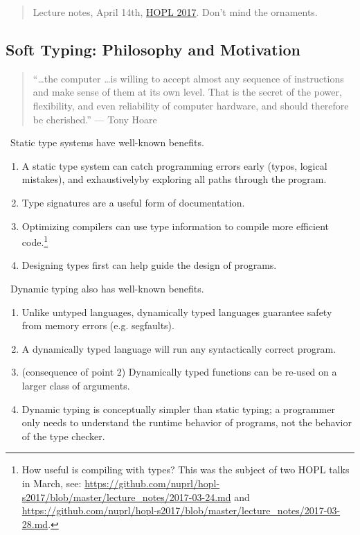 \documentclass{article}
\begin{document}

\newcommand{\todo}[1]{\textbf{TODO: #1}}

\begin{abstract}
Lecture notes, April 14th, \href{http://www.ccs.neu.edu/home/matthias/7480-s17/index.html}{HOPL 2017}.
Don't mind the ornaments.
\end{abstract}

\subsection*{Soft Typing: Philosophy and Motivation}

\begin{quote}
``\ldots the computer \ldots is willing to accept almost any sequence of
  instructions and make sense of them at its own level.
  That is the secret of the power, flexibility, and even reliability of computer
  hardware, and should therefore be cherished.'' --- Tony Hoare~\cite{h-dtic-1973}
\end{quote}

\noindent \aldine~Static type systems have well-known benefits.
\begin{enumerate}
\item
  A static type system can catch programming errors early (typos, logical mistakes),
  and exhaustively\textemdash by exploring all paths through the program.
\item
  Type signatures are a useful form of documentation.
\item
  Optimizing compilers can use type information to compile more efficient
  code.\footnote{How useful is compiling with types? This was the subject of two HOPL talks in March, see:
                 \url{https://github.com/nuprl/hopl-s2017/blob/master/lecture_notes/2017-03-24.md} and
                 \url{https://github.com/nuprl/hopl-s2017/blob/master/lecture_notes/2017-03-28.md}.}
\item
  Designing types first can help guide the design of programs.
\end{enumerate}

\noindent \bomb~Dynamic typing also has well-known benefits.
\begin{enumerate}
\item
  Unlike untyped languages, dynamically typed languages guarantee safety from
  memory errors (e.g. segfaults).
\item
  A dynamically typed language will run any syntactically correct program.
\item
  (consequence of point 2) Dynamically typed functions can be re-used on
  a larger class of arguments.
\item
  Dynamic typing is conceptually simpler than static typing; a programmer
  only needs to understand the runtime behavior of programs, not the behavior
  of the type checker.
\end{enumerate}
\end{document}
